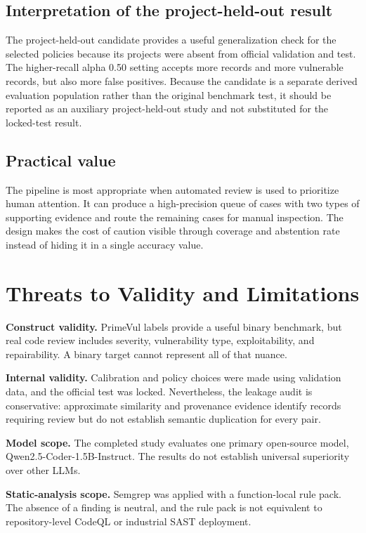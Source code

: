 \documentclass[pdflatex,sn-mathphys-num]{sn-jnl}
\begin{document}
\subsection{Interpretation of the project-held-out result}

The project-held-out candidate provides a useful generalization check for the selected policies because its projects were absent from official validation and test. The higher-recall alpha 0.50 setting accepts more records and more vulnerable records, but also more false positives. Because the candidate is a separate derived evaluation population rather than the original benchmark test, it should be reported as an auxiliary project-held-out study and not substituted for the locked-test result.

\subsection{Practical value}

The pipeline is most appropriate when automated review is used to prioritize human attention. It can produce a high-precision queue of cases with two types of supporting evidence and route the remaining cases for manual inspection. The design makes the cost of caution visible through coverage and abstention rate instead of hiding it in a single accuracy value.

\section{Threats to Validity and Limitations}\label{sec:limitations}

\textbf{Construct validity.} PrimeVul labels provide a useful binary benchmark, but real code review includes severity, vulnerability type, exploitability, and repairability. A binary target cannot represent all of that nuance.

\textbf{Internal validity.} Calibration and policy choices were made using validation data, and the official test was locked. Nevertheless, the leakage audit is conservative: approximate similarity and provenance evidence identify records requiring review but do not establish semantic duplication for every pair.

\textbf{Model scope.} The completed study evaluates one primary open-source model, Qwen2.5-Coder-1.5B-Instruct. The results do not establish universal superiority over other LLMs.

\textbf{Static-analysis scope.} Semgrep was applied with a function-local rule pack. The absence of a finding is neutral, and the rule pack is not equivalent to repository-level CodeQL or industrial SAST deployment.
\end{document}
